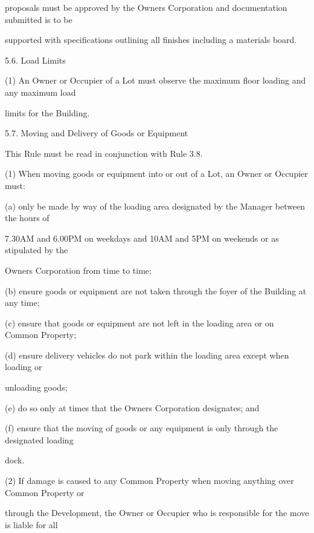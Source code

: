 \documentclass{article}
\begin{document}
{\fontsize{10.02}{1}proposals must be approved by the Owners Corporation and documentation submitted is to be }

{\fontsize{10.02}{1}supported with specifications outlining all finishes including a materials board. }

{\fontsize{9.99}{1}5.6. Load Limits }

{\fontsize{9.962}{1}(1) An Owner or Occupier of a Lot must observe the maximum floor loading and any maximum load }

{\fontsize{10.02}{1}limits for the Building. }

\newpage

{\fontsize{9.99}{1}5.7. Moving and Delivery of Goods or Equipment }

{\fontsize{10.02}{1}This Rule must be read in conjunction with Rule 3.8. }

{\fontsize{9.962}{1}(1) When moving goods or equipment into or out of a Lot, an Owner or Occupier must: }

{\fontsize{9.962}{1}(a) only be made by way of the loading area designated by the Manager between the hours of }

{\fontsize{10.02}{1}7.30AM and 6.00PM on weekdays and 10AM and 5PM on weekends or as stipulated by the }

{\fontsize{10.02}{1}Owners Corporation from time to time; }

{\fontsize{9.962}{1}(b) ensure goods or equipment are not taken through the foyer of the Building at any time; }

{\fontsize{9.962}{1}(c) ensure that goods or equipment are not left in the loading area or on Common Property; }

{\fontsize{9.962}{1}(d) ensure delivery vehicles do not park within the loading area except when loading or }

{\fontsize{10.02}{1}unloading goods; }

{\fontsize{9.962}{1}(e) do so only at times that the Owners Corporation designates; and }

{\fontsize{9.962}{1}(f) ensure that the moving of goods or any equipment is only through the designated loading }

{\fontsize{10.02}{1}dock. }

{\fontsize{9.962}{1}(2) If damage is caused to any Common Property when moving anything over Common Property or }

{\fontsize{10.02}{1}through the Development, the Owner or Occupier who is responsible for the move is liable for all }
\end{document}
